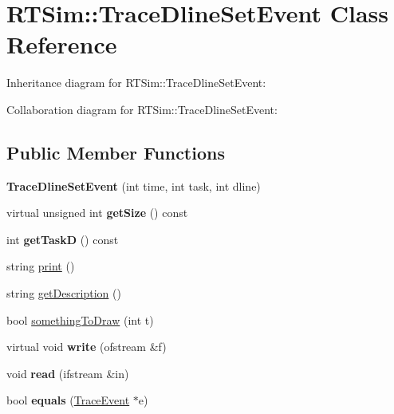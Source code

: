 \hypertarget{classRTSim_1_1TraceDlineSetEvent}{}\section{R\+T\+Sim\+:\+:Trace\+Dline\+Set\+Event Class Reference}
\label{classRTSim_1_1TraceDlineSetEvent}


Inheritance diagram for R\+T\+Sim\+:\+:Trace\+Dline\+Set\+Event\+:


Collaboration diagram for R\+T\+Sim\+:\+:Trace\+Dline\+Set\+Event\+:
\subsection*{Public Member Functions}
\begin{DoxyCompactItemize}
\item 
{\bfseries Trace\+Dline\+Set\+Event} (int time, int task, int dline)\hypertarget{classRTSim_1_1TraceDlineSetEvent_a7669cf8fafdb12d25605ee3d357c8b4f}{}\label{classRTSim_1_1TraceDlineSetEvent_a7669cf8fafdb12d25605ee3d357c8b4f}

\item 
virtual unsigned int {\bfseries get\+Size} () const \hypertarget{classRTSim_1_1TraceDlineSetEvent_a0d5057b1293e801e8135811714d95fb9}{}\label{classRTSim_1_1TraceDlineSetEvent_a0d5057b1293e801e8135811714d95fb9}

\item 
int {\bfseries get\+TaskD} () const \hypertarget{classRTSim_1_1TraceDlineSetEvent_ab0dbf17dc322f70a212dedb39d7f812e}{}\label{classRTSim_1_1TraceDlineSetEvent_ab0dbf17dc322f70a212dedb39d7f812e}

\item 
string \hyperlink{classRTSim_1_1TraceDlineSetEvent_aded14ac90a7e86c0bd14cf20a9426d9b}{print} ()
\item 
string \hyperlink{classRTSim_1_1TraceDlineSetEvent_a1b8b439034119808d43c6249971ff8d8}{get\+Description} ()
\item 
bool \hyperlink{classRTSim_1_1TraceDlineSetEvent_a8a5a1b1ca85fd9904acec6c134484701}{something\+To\+Draw} (int t)
\item 
virtual void {\bfseries write} (ofstream \&f)\hypertarget{classRTSim_1_1TraceDlineSetEvent_aeeb094516ae6cde07918e44d68017f36}{}\label{classRTSim_1_1TraceDlineSetEvent_aeeb094516ae6cde07918e44d68017f36}

\item 
void {\bfseries read} (ifstream \&in)\hypertarget{classRTSim_1_1TraceDlineSetEvent_aedc3384fb82940d29a7076bbb92015d8}{}\label{classRTSim_1_1TraceDlineSetEvent_aedc3384fb82940d29a7076bbb92015d8}

\item 
bool {\bfseries equals} (\hyperlink{classRTSim_1_1TraceEvent}{Trace\+Event} $\ast$e)\hypertarget{classRTSim_1_1TraceDlineSetEvent_afea0cbd92c28761f0722dc10d00c3971}{}\label{classRTSim_1_1TraceDlineSetEvent_afea0cbd92c28761f0722dc10d00c3971}

\end{DoxyCompactItemize}
